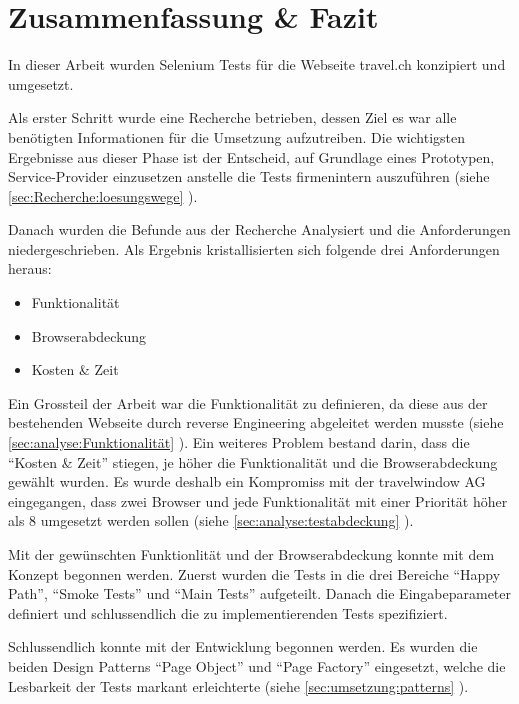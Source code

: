 
\chapter{Zusammenfassung \& Fazit}
In dieser Arbeit wurden Selenium Tests für die Webseite travel.ch konzipiert und umgesetzt. 

Als erster Schritt wurde eine Recherche betrieben, dessen Ziel es war alle benötigten Informationen für die Umsetzung aufzutreiben. Die wichtigsten Ergebnisse aus dieser Phase ist der Entscheid, auf Grundlage eines Prototypen, Service-Provider einzusetzen anstelle die Tests firmenintern auszuführen (siehe \cref{sec:Recherche:loesungswege} ). 

Danach wurden die Befunde aus der Recherche Analysiert und die Anforderungen niedergeschrieben. Als Ergebnis kristallisierten sich folgende drei Anforderungen heraus:
\begin{itemize}
\item Funktionalität
\item Browserabdeckung
\item Kosten \& Zeit
\end{itemize}
Ein Grossteil der Arbeit war die Funktionalität zu definieren, da diese aus der bestehenden Webseite durch reverse Engineering abgeleitet werden musste (siehe \cref{sec:analyse:Funktionalität} ). Ein weiteres Problem bestand darin, dass die "`Kosten \& Zeit"' stiegen, je höher die Funktionalität und die Browserabdeckung gewählt wurden. Es wurde deshalb ein Kompromiss mit der travelwindow AG eingegangen, dass zwei Browser und jede Funktionalität mit einer Priorität höher als 8 umgesetzt werden sollen (siehe  \cref{sec:analyse:testabdeckung} ).

Mit der gewünschten Funktionlität und der Browserabdeckung konnte mit dem Konzept begonnen werden. Zuerst wurden die Tests in die drei Bereiche "`Happy Path"', "`Smoke Tests"' und "`Main Tests"' aufgeteilt. Danach die Eingabeparameter definiert und schlussendlich die zu implementierenden Tests spezifiziert.

Schlussendlich konnte mit der Entwicklung begonnen werden. Es wurden die beiden Design Patterns "`Page Object"' und "`Page Factory"' eingesetzt, welche die Lesbarkeit der Tests markant erleichterte (siehe \cref{sec:umsetzung:patterns} ).